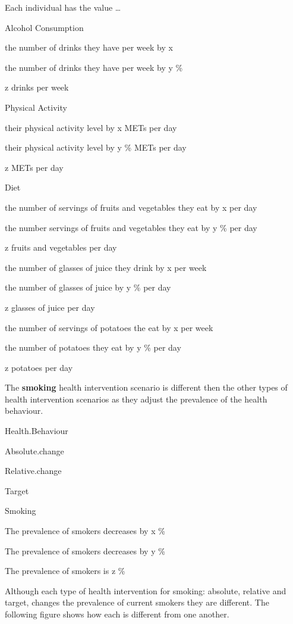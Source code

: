 \documentclass[]{book}
\begin{document}
Each individual has the value \ldots{}

Alcohol Consumption

the number of drinks they have per week by x

the number of drinks they have per week by y \%

z drinks per week

Physical Activity

their physical activity level by x METs per day

their physical activity level by y \% METs per day

z METs per day

Diet

the number of servings of fruits and vegetables they eat by x per day

the number servings of fruits and vegetables they eat by y \% per day

z fruits and vegetables per day

the number of glasses of juice they drink by x per week

the number of glasses of juice by y \% per day

z glasses of juice per day

the number of servings of potatoes the eat by x per week

the number of potatoes they eat by y \% per day

z potatoes per day

The \textbf{smoking} health intervention scenario is different then the
other types of health intervention scenarios as they adjust the
prevalence of the health behaviour.

Health.Behaviour

Absolute.change

Relative.change

Target

Smoking

The prevalence of smokers decreases by x \%

The prevalence of smokers decreases by y \%

The prevalence of smokers is z \%

Although each type of health intervention for smoking: absolute,
relative and target, changes the prevalence of current smokers they are
different. The following figure shows how each is different from one
another.
\end{document}
